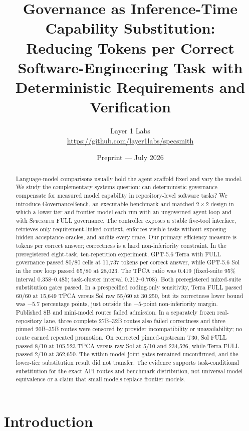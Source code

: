 \documentclass[10pt,twocolumn]{article}
\title{Governance as Inference-Time Capability Substitution:\\
Reducing Tokens per Correct Software-Engineering Task with Deterministic
Requirements and Verification}
\author{Layer 1 Labs\\
\url{https://github.com/layer1labs/specsmith}}
\date{Preprint --- July 2026}
\newcommand{\specsmith}{\textsc{Specsmith}}
\begin{document}
\maketitle

\begin{abstract}
Language-model comparisons usually hold the agent scaffold fixed and vary the
model. We study the complementary systems question: can deterministic
governance compensate for measured model capability in repository-level
software tasks? We introduce GovernanceBench, an executable benchmark and
matched $2\times2$ design in which a lower-tier and frontier model each run
with an ungoverned agent loop and with \specsmith{} FULL governance. The
controller exposes a stable five-tool interface, retrieves only
requirement-linked context, enforces visible tests without exposing hidden
acceptance oracles, and audits every trace. Our primary efficiency measure is
tokens per correct answer; correctness is a hard non-inferiority constraint.
In the preregistered eight-task, ten-repetition experiment, GPT-5.6 Terra with
FULL governance passed 80/80 cells at 11,737 tokens per correct answer, while
GPT-5.6 Sol in the raw loop passed 65/80 at 28,023. The TPCA ratio was 0.419
(fixed-suite 95\% interval 0.358--0.485; task-cluster interval 0.212--0.708).
Both preregistered mixed-suite substitution gates passed. In a prespecified
coding-only sensitivity, Terra FULL passed 60/60 at 15,649 TPCA versus Sol raw
55/60 at 30,250, but its correctness lower bound was $-5.7$ percentage points,
just outside the $-5$-point non-inferiority margin. Published 8B and mini-model
routes failed admission. In a separately frozen real-repository lane, three
complete 27B--32B routes also failed correctness and three pinned 20B--35B
routes were censored by provider incompatibility or unavailability; no route
earned repeated promotion. On corrected pinned-upstream T30, Sol FULL passed
8/10 at 105,523 TPCA versus raw Sol at 5/10 and 234,526, while Terra FULL
passed 2/10 at 362,650. The within-model joint gates remained unconfirmed, and
the lower-tier substitution result did not transfer. The evidence supports
task-conditional substitution for the exact API routes and benchmark
distribution, not universal model equivalence or a claim that small models
replace frontier models.
\end{abstract}

\section{Introduction}
\end{document}
